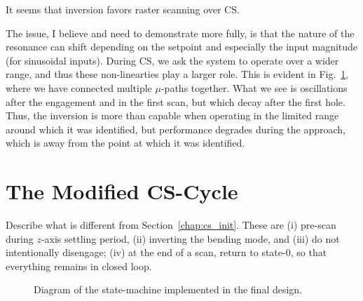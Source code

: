 \documentclass[11pt]{article}
\begin{document}
It seems that inversion favors raster scanning over CS.

The issue, I believe and need to demonstrate more fully, is that the nature of the resonance can shift depending on the setpoint and especially the input magnitude (for sinusoidal inputs). During CS, we ask the system to operate over a wider range, and thus these non-linearties play a larger role. This is evident in Fig.~\ref{fig:dinv_CS_decay}, where we have connected multiple $\mu$-paths together. What we see is oscillations after the engagement and in the first scan, but which decay after the first hole. Thus, the inversion is more than capable when operating in the limited range around which it was identified, but performance degrades during the approach, which is away from the point at which it was identified.


\begin{figure}
  \centering
  
  \caption{}
  \label{fig:dinv_CS_decay}
\end{figure}

\section{The Modified CS-Cycle}\label{sec:modfied_cs_cycle}
Describe what is different from Section~\ref{chap:cs_init}. These are (i) pre-scan during $z$-axis settling period, (ii) inverting the bending mode, and (iii) do not intentionally disengage; (iv) at the end of a scan, return to state-0, so that everything remains in closed loop.
\begin{figure}
  \centering
    
    \caption{Diagram of the state-machine implemented in the final design.}
    \label{fig:sm_final}
\end{figure}
\end{document}
